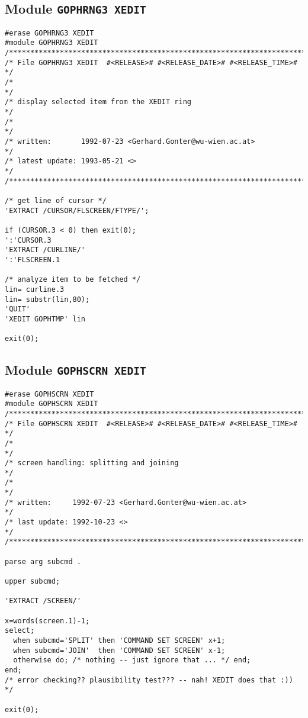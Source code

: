 \subsection{Module {\tt GOPHRNG3 XEDIT}}

\def\LPtopD{Module {\tt GOPHRNG3 XEDIT}}

\def\LPtopF{~}

\begin{verbatim}
#erase GOPHRNG3 XEDIT
#module GOPHRNG3 XEDIT
/***********************************************************************/
/* File GOPHRNG3 XEDIT  #<RELEASE># #<RELEASE_DATE># #<RELEASE_TIME># */
/*                                                                     */
/* display selected item from the XEDIT ring                           */
/*                                                                     */
/* written:       1992-07-23 <Gerhard.Gonter@wu-wien.ac.at>            */
/* latest update: 1993-05-21 <>                                        */
/***********************************************************************/

/* get line of cursor */
'EXTRACT /CURSOR/FLSCREEN/FTYPE/';

if (CURSOR.3 < 0) then exit(0);
':'CURSOR.3
'EXTRACT /CURLINE/'
':'FLSCREEN.1

/* analyze item to be fetched */
lin= curline.3
lin= substr(lin,80);
'QUIT'
'XEDIT GOPHTMP' lin

exit(0);
\end{verbatim}

\subsection{Module {\tt GOPHSCRN XEDIT}}

\def\LPtopD{Module {\tt GOPHSCRN XEDIT}}

\def\LPtopF{~}

\begin{verbatim}
#erase GOPHSCRN XEDIT
#module GOPHSCRN XEDIT
/***********************************************************************/
/* File GOPHSCRN XEDIT  #<RELEASE># #<RELEASE_DATE># #<RELEASE_TIME>#  */
/*                                                                     */
/* screen handling: splitting and joining                              */
/*                                                                     */
/* written:     1992-07-23 <Gerhard.Gonter@wu-wien.ac.at>              */
/* last update: 1992-10-23 <>                                          */
/***********************************************************************/

parse arg subcmd .

upper subcmd;

'EXTRACT /SCREEN/'

x=words(screen.1)-1;
select;
  when subcmd='SPLIT' then 'COMMAND SET SCREEN' x+1;
  when subcmd='JOIN'  then 'COMMAND SET SCREEN' x-1;
  otherwise do; /* nothing -- just ignore that ... */ end;
end;
/* error checking?? plausibility test??? -- nah! XEDIT does that :)) */

exit(0);
\end{verbatim}

